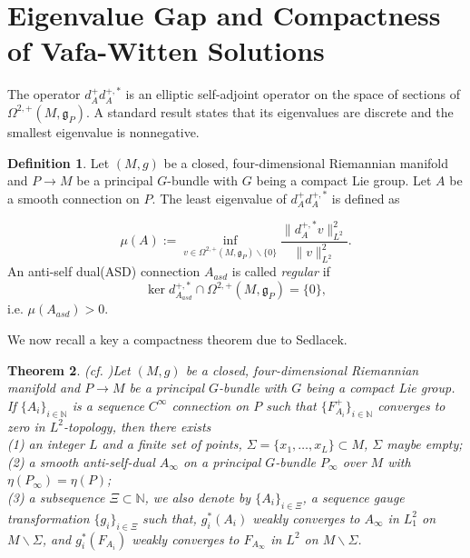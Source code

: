 \documentclass[12pt, twoside]{article}
\newtheorem{theorem}{Theorem}[section]
\theoremstyle{definition}
\newtheorem{definition}[theorem]{Definition}
\numberwithin{equation}{section}
\def \N {\mathbb{N}}
\def\Om{\Omega}
\begin{document}
\section{Eigenvalue Gap and Compactness of Vafa-Witten Solutions}

The operator $d_{A}^{+}d^{+,\ast}_{A}$ is an elliptic self-adjoint operator on the space of sections of $\Om^{2,+}(M,\mathfrak{g}_{P})$. 
A standard result states that its eigenvalues are discrete and the smallest eigenvalue is nonnegative.
\begin{definition}
Let $(M,g)$ be a closed, four-dimensional Riemannian
manifold and $P\rightarrow M$ be a principal $G$-bundle with $G$ being a compact Lie group. Let $A$ be a smooth connection on $P$. 
The least eigenvalue of  $d_{A}^{+}d_{A}^{+,\ast}$ is defined as
\end{definition}
\begin{equation*}
\mu(A):=\inf_{v\in\Om^{2,+}(M,\mathfrak{g}_{P})\backslash\{0\}}\frac{\|d^{+,\ast}_{A}v\|_{L^2}^{2}}{\|v\|_{L^2}^{2}}.
\end{equation*}
An anti-self dual(ASD) connection $A_{asd}$ is  called \textit{regular} if 
$$\ker d^{+,\ast}_{A_{asd}}\cap\Om^{2,+}(M,\mathfrak{g}_{P})=\{0\},$$ 
i.e. $\mu(A_{asd})>0$.

We now recall a key a compactness theorem due to Sedlacek.

\begin{theorem}(cf. \cite[Theorem 4.3]{Sed82})\label{T7}
Let $(M,g)$ be a closed, four-dimensional Riemannian manifold and $P\rightarrow M$ be a principal $G$-bundle with $G$ being a compact Lie group. If $\{A_{i}\}_{i\in\mathbb{N}}$ is a sequence $C^{\infty}$ connection on $P$ such that $\{F^{+}_{A_{i}}\}_{i\in\N}$ converges to zero in $L^{2}$-topology, then there exists\\
(1) an integer $L$ and a finite set of points, $\Sigma=\{x_{1},\ldots,x_{L}\}\subset M$, $\Sigma$ maybe empty;\\
(2) a smooth anti-self-dual $A_{\infty}$ on a principal $G$-bundle $P_{\infty}$ over $M$ with $\eta(P_{\infty})=\eta(P)$;\\
(3) a subsequence $\Xi\subset\N$, we also denote by $\{A_{i}\}_{i\in\Xi}$, a sequence gauge transformation $\{g_{i}\}_{i\in\Xi}$ such that, $g^{\ast}_{i}(A_{i})$ weakly converges to $A_{\infty}$ in $L^{2}_{1}$ on $M\backslash\Sigma$, and $g_{i}^{\ast}(F_{A_{i}})$ weakly converges to $F_{A_{\infty}}$ in $L^{2}$ on $M\backslash\Sigma$.
\end{theorem}	
\end{document}
